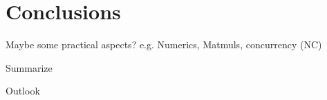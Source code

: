 \chapter{Conclusions}\label{\positionnumber}   
Maybe some practical aspects? 
e.g. Numerics, Matmuls, concurrency (NC)

Summarize

Outlook
